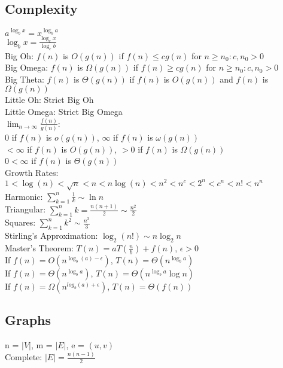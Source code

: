 \documentclass{article}
\begin{document}
\begin{multicols*}{2}
        \subsection*{Complexity}
        $a^{\log_b x} = x^{\log_b a}$\\
        $\log_b x = \frac{\log_c x}{\log_c b}$\\
        Big Oh: $f(n)$ is $O(g(n))$ if $f(n) \leq cg(n)$ for $n \geq n_0 : c, n_0 > 0$\\
        Big Omega: $f(n)$ is $\Omega(g(n))$ if $f(n) \geq cg(n)$ for $n \geq n_0 : c, n_0 > 0$\\
        Big Theta: $f(n)$ is $\Theta(g(n))$ if $f(n)$ is $O(g(n))$ and $f(n)$ is $\Omega(g(n))$\\
        Little Oh: Strict Big Oh\\
        Little Omega: Strict Big Omega\\
        $\lim_{n\to\infty}\frac{f(n)}{g(n)}$:\\
        0 if $f(n)$ is $o(g(n))$, $\infty$ if $f(n)$ is $\omega(g(n))$\\
        $< \infty$ if $f(n)$ is $O(g(n))$, $> 0$ if $f(n)$ is $\Omega(g(n))$\\
        $0 < \infty$ if $f(n)$ is $\Theta(g(n))$\\
        Growth Rates: $1 < \log(n) < \sqrt{n} < n < n\log(n) < n^2 < n^c < 2^n < c^n < n! < n^n$\\
        Harmonic: $\sum_{k=1}^{n} \frac{1}{k} \sim \ln n$\\
        Triangular: $\sum_{k=1}^{n} k = \frac{n(n + 1)}{2} \sim \frac{n^2}{2}$\\
        Squares: $\sum_{k=1}^{n} k^2 \sim \frac{n^3}{3}$\\
        Stirling's Approximation: $\log_2(n!) \sim n\log_2 n$\\
        Master's Theorem: $T(n) = aT(\frac{n}{b}) + f(n)$, $\epsilon > 0$\\
        If $f(n) = O(n^{\log_b (a) - \epsilon})$, $T(n) = \Theta(n^{\log_b a})$\\
        If $f(n) = \Theta(n^{\log_b a})$, $T(n) = \Theta(n^{\log_b a}\log n)$\\
        If $f(n) = \Omega(n^{log_b (a) + \epsilon})$, $T(n) = \Theta(f(n))$
        \subsection*{Graphs}
        n = $\rvert V \lvert$, m = $\rvert E \lvert$, e = $(u, v)$\\
        Complete: $\lvert E \rvert = \frac{n(n - 1)}{2}$

\end{multicols*}
\end{document}
